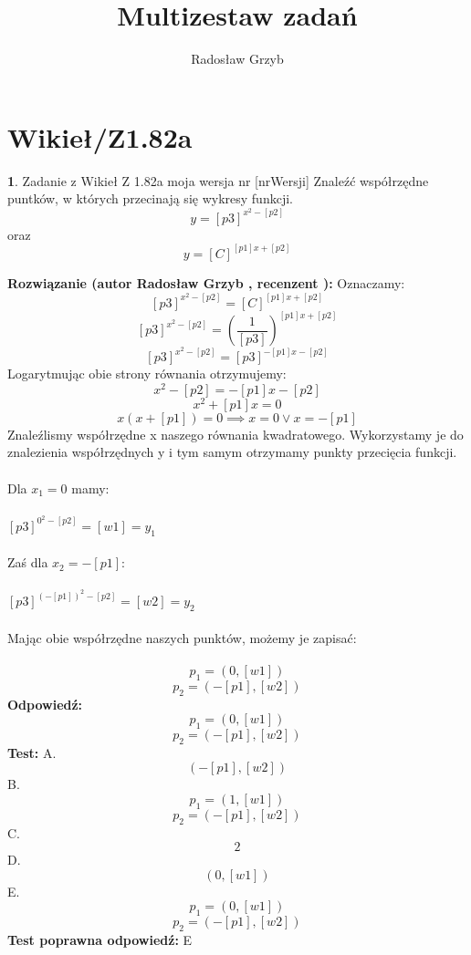 \documentclass[12pt, a4paper]{article}
\title{Multizestaw zadań}
\author{Radosław Grzyb}
\date{}
\theoremstyle{definition} %
\newtheorem{zad}{}
\newcommand{\kategoria}[1]{\section{#1}} %
\newcommand{\zadStart}[1]{\begin{zad}#1\newline} %
\newcommand{\zadStop}{\end{zad}}   %
\newcommand{\rozwStart}[2]{\noindent \textbf{Rozwiązanie (autor #1 , recenzent #2): }\newline} %
\newcommand{\rozwStop}{\newline}                                            %
\newcommand{\odpStart}{\noindent \textbf{Odpowiedź:}\newline}    %
\newcommand{\odpStop}{\newline}                                             %
\newcommand{\testStart}{\noindent \textbf{Test:}\newline} %
\newcommand{\testStop}{\newline} %
\newcommand{\kluczStart}{\noindent \textbf{Test poprawna odpowiedź:}\newline} %
\newcommand{\kluczStop}{\newline} %
\begin{document}
\maketitle
\kategoria{Wikieł/Z1.82a}
\zadStart{Zadanie z Wikieł Z 1.82a moja wersja nr [nrWersji]}
Znaleźć współrzędne puntków, w których przecinają się wykresy funkcji.
$$y=[p3]^{x^{2}-[p2]}$$ oraz $$y=[C]^{[p1]x+[p2]}$$
\zadStop
\rozwStart{Radosław Grzyb}{}
Oznaczamy:
$$[p3]^{x^{2}-[p2]}=[C]^{[p1]x+[p2]}$$
$$[p3]^{x^{2}-[p2]}=(\frac{1}{[p3]})^{[p1]x+[p2]}$$
$$[p3]^{x^{2}-[p2]}=[p3]^{-[p1]x-[p2]}$$
Logarytmując obie strony równania otrzymujemy:\\
$$x^{2}-[p2]=-[p1]x-[p2]$$
$$x^{2}+[p1]x=0$$
$$x(x+[p1])=0\implies x=0 \lor x=-[p1]$$
Znaleźlismy współrzędne x naszego równania kwadratowego. Wykorzystamy je do znalezienia współrzędnych y i tym samym otrzymamy punkty przecięcia funkcji.\\\\
Dla $x_{1}=0$ mamy:\\\\
$[p3]^{0^{2}-[p2]}=[w1]=y_{1}$\\\\
Zaś dla $x_{2}=-[p1]$:\\\\
$[p3]^{(-[p1])^{2}-[p2]}=[w2]=y_{2}$\\\\
Mając obie współrzędne naszych punktów, możemy je zapisać:\\\\
$$p_{1}=(0,[w1])$$
$$p_{2}=(-[p1],[w2])$$
\rozwStop
\odpStart
$$p_{1}=(0,[w1])$$
$$p_{2}=(-[p1],[w2])$$
\odpStop
\testStart
A.$$(-[p1],[w2])$$
B.$$p_{1}=(1,[w1])$$
$$p_{2}=(-[p1],[w2])$$
C.$$2$$
D.$$(0,[w1])$$
E.$$p_{1}=(0,[w1])$$
$$p_{2}=(-[p1],[w2])$$ 
\testStop
\kluczStart
E
\kluczStop
\end{document}
